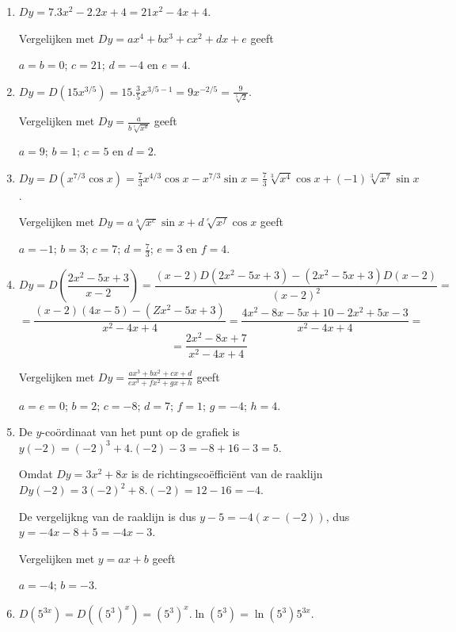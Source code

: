 \documentclass{article}
\begin{document}
\begin{enumerate}

\item

$Dy=7.3x^2-2.2x+4=21x^2-4x+4$.

Vergelijken met $Dy=ax^4+bx^3+cx^2+dx+e$ geeft

$a=b=0$; $c=21$; $d=-4$ en $e=4$.

\item

$Dy=D \left( 15x^{3/5} \right)=15.\frac{3}{5} x^{3/5-1}=9x^{-2/5}=\frac{9}{\sqrt[5]{2}}$.

Vergelijken met $Dy=\frac{a}{b\sqrt[c]{x^d}}$ geeft

$a=9$; $b=1$; $c=5$ en $d=2$.
\item

$Dy=D \left( x^{7/3}\cos x \right)=\frac{7}{3} x^{4/3} \cos x-x^{7/3} \sin x= \frac{7}{3}\sqrt[3]{x^4}\cos x+(-1) \sqrt[3]{x^7} \sin x$.

Vergelijken met $Dy=a\sqrt[b]{x^c}\sin x+d\sqrt[e]{x^f}\cos x$ geeft

$a=-1$; $b=3$; $c=7$; $d=\frac{7}{3}$; $e=3$ en $f=4$.
\item

\[
Dy=D \left(  \frac{2x^2-5x+3}{x-2}  \right)=\frac{(x-2)D \left(  2x^2-5x+3 \right) -\left(  2x^2-5x+3 \right)D(x-2)}{(x-2)^2}=
\]
\[
=\frac{(x-2)(4x-5)-\left(  Zx^2-5x+3 \right)}{x^2-4x+4}=\frac{4x^2-8x-5x+10-2x^2+5x-3}{x^2-4x+4}=
\]
\[
=\frac{2x^2-8x+7}{x^2-4x+4} 
\]

Vergelijken met $Dy=\frac{ax^3+bx^2+cx+d}{ex^3+fx^2+gx+h}$ geeft

$a=e=0$; $b=2$; $c=-8$; $d=7$; $f=1$; $g=-4$; $h=4$.

\item

De $y$-co\"ordinaat van het punt op de grafiek is $y(-2)=(-2)^3+4.(-2)-3=-8+16-3=5$.

Omdat $Dy=3x^2+8x$ is de richtingsco\"effici\"ent van de raaklijn $Dy(-2)=3(-2)^2+8.(-2)=12-16=-4$.

De vergelijkng van de raaklijn is dus $y-5=-4(x-(-2))$, dus $y=-4x-8+5=-4x-3$.

Vergelijken met $y=ax+b$ geeft

$a=-4$; $b=-3$.

\item

$D \left( 5^{3x} \right)=D \left(  \left(  5^3 \right)^x \right) =\left(  5^3 \right)^x.\ln \left(  5^3 \right)=\ln \left( 5^3 \right)5^{3x}$.


\end{enumerate}
\end{document}
